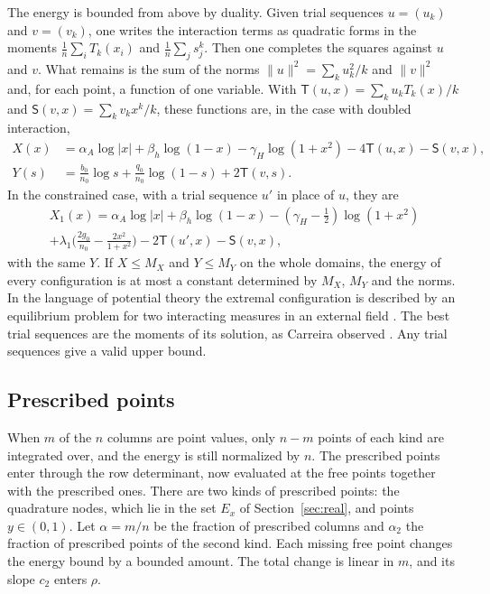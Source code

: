 The energy is bounded from above by duality. Given trial sequences $u=(u_k)$ and $v=(v_k)$, one writes the
interaction terms as quadratic forms in the moments $\frac1n\sum_iT_k(x_i)$ and $\frac1n\sum_js_j^k$. Then one
completes the squares against $u$ and $v$. What remains is the sum of the norms $\|u\|^2=\sum_ku_k^2/k$ and
$\|v\|^2$ and, for each point, a function of one variable. With $\mathsf T(u,x)=\sum_ku_kT_k(x)/k$ and
$\mathsf S(v,x)=\sum_kv_kx^k/k$, these functions are, in the case with doubled interaction,
\begin{align*}
 X(x)&=\alpha_A\log|x|+\beta_h\log(1-x)-\gamma_H\log(1+x^2)-4\mathsf T(u,x)-\mathsf S(v,x),\\
 Y(s)&=\tfrac{b_0}{n_0}\log s+\tfrac{q_0}{n_0}\log(1-s)+2\mathsf T(v,s).
\end{align*}
In the constrained case, with a trial sequence $u'$ in place of $u$, they are
\begin{multline*}
 X_1(x)=\alpha_A\log|x|+\beta_h\log(1-x)-(\gamma_H-\tfrac12)\log(1+x^2)\\
 +\lambda_1\bigl(\tfrac{2g_0}{n_0}-\tfrac{2x^2}{1+x^2}\bigr)-2\mathsf T(u',x)-\mathsf S(v,x),
\end{multline*}
with the same $Y$. If $X\le M_X$ and $Y\le M_Y$ on the whole domains, the energy of every configuration is at
most a constant determined by $M_X$, $M_Y$ and the norms. In the language of potential theory the extremal
configuration is described by an equilibrium problem for two interacting measures in an external field
\cite{SaffTotik}. The best trial sequences are the moments of its solution, as Carreira observed
\cite{Carreira2026}. Any trial sequences give a valid upper bound.

\subsection{Prescribed points}\label{ssec:prescribed}
When $m$ of the $n$ columns are point values, only $n-m$ points of each kind are integrated over, and the
energy is still normalized by $n$. The prescribed points enter through the row determinant, now evaluated
at the free points together with the prescribed ones. There are two kinds of prescribed points: the
quadrature nodes, which lie in the set $E_x$ of Section~\ref{sec:real}, and points $y\in(0,1)$. Let $\alpha=m/n$ be the fraction of
prescribed columns and $\alpha_2$ the fraction of prescribed points of the second kind. Each missing free point
changes the energy bound by a bounded amount. The total change is linear in $m$, and its slope $c_2$ enters
$\rho$.

